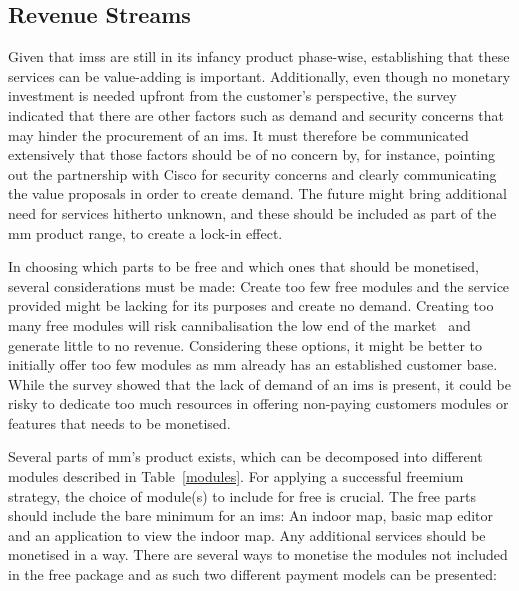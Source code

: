 \subsection{Revenue Streams}
Given that \glspl{ims} are still in its infancy product phase-wise, establishing that these services can be value-adding is important. Additionally, even though no monetary investment is needed upfront from the customer's perspective, the survey indicated that there are other factors such as demand and security concerns that may hinder the procurement of an \gls{ims}. It must therefore be communicated extensively that those factors should be of no concern by, for instance, pointing out the partnership with Cisco for security concerns and clearly communicating the value proposals in order to create demand. The future might bring additional need for services hitherto unknown, and these should be included as part of the \gls{mm} product range, to create a lock-in effect. 


In choosing which parts to be free and which ones that should be monetised, several considerations must be made: Create too few free modules and the service provided might be lacking for its purposes and create no demand. Creating too many free modules will risk cannibalisation the low end of the market~\cite{keller2011strategic} and generate little to no revenue. Considering these options, it might be better to initially offer too few modules as \gls{mm} already has an established customer base. While the survey showed that the lack of demand of an \gls{ims} is present, it could be risky to dedicate too much resources in offering non-paying customers modules or features that needs to be monetised. 


Several parts of \gls{mm}'s product exists, which can be decomposed into different modules described in Table~\ref{modules}. For applying a successful freemium strategy, the choice of module(s) to include for free is crucial. The free parts should include the bare minimum for an \gls{ims}: An indoor map, basic map editor and an application to view the indoor map. Any additional services should be monetised in a way. There are several ways to monetise the modules not included in the free package and as such two different payment models can be presented:


